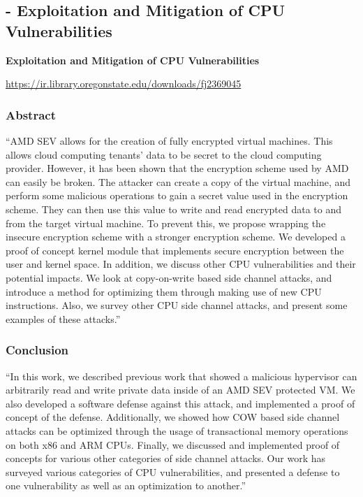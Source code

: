 
\subsection{\cite{mestas_exploitation_2021} - Exploitation and Mitigation of CPU Vulnerabilities}

\textbf{Exploitation and Mitigation of CPU Vulnerabilities}

\url{https://ir.library.oregonstate.edu/downloads/fj2369045}

\subsubsection*{Abstract \cite{mestas_exploitation_2021}}
“AMD SEV allows for the creation of fully encrypted virtual machines. This allows cloud computing tenants’ data to be secret to the cloud computing provider. However, it has been shown that the encryption scheme used by AMD can easily be broken. The attacker can create a copy of the virtual machine, and perform some malicious operations to gain a secret value used in the encryption scheme. They can then use this value to write and read encrypted data to and from the target virtual machine. To prevent this, we propose wrapping the insecure encryption scheme with a stronger encryption scheme. We developed a proof of concept kernel module that implements secure encryption between the user and kernel space. In addition, we discuss other CPU vulnerabilities and their potential impacts. We look at copy-on-write based side channel attacks, and introduce a method for optimizing them through making use of new CPU instructions. Also, we survey other CPU side channel attacks, and present some examples of these attacks.”

\subsubsection*{Conclusion \cite{mestas_exploitation_2021}}
“In this work, we described previous work that showed a malicious hypervisor can arbitrarily read and write private data inside of an AMD SEV protected VM. We also developed a software defense against this attack, and implemented a proof of concept of the defense. Additionally, we showed how COW based side channel attacks can be optimized through the usage of transactional memory operations on both x86 and ARM CPUs. Finally, we discussed and implemented proof of concepts for various other categories of side channel attacks. Our work has surveyed various categories of CPU vulnerabilities, and presented a defense to one vulnerability as well as an optimization to another.”

